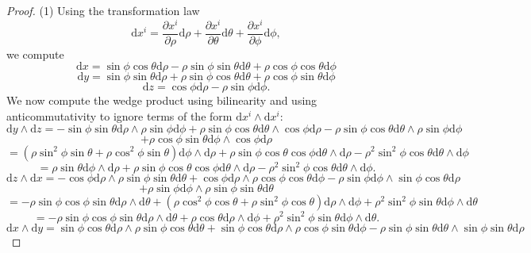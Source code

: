 \documentclass[10pt, letterpaper]{article}
\begin{document}
\begin{proof}
	(1) Using the transformation law
	\[
		\mathrm{d} x^i=\frac{\partial x^i}{\partial \rho } \mathrm{d} \rho +\frac{\partial x^i}{\partial \theta } \mathrm{d} \theta +\frac{\partial x^i}{\partial \phi } \mathrm{d} \phi ,
	\]
	we compute
	\[
		\mathrm{d} x=\sin \phi \cos \theta \mathrm{d} \rho - \rho \sin \phi \sin \theta \mathrm{d} \theta +\rho \cos \phi \cos \theta \mathrm{d} \phi 
	\]
	\[
		\mathrm{d} y=\sin \phi \sin \theta \mathrm{d} \rho +\rho \sin \phi \cos \theta \mathrm{d} \theta +\rho \cos \phi \sin \theta \mathrm{d} \phi 
	\]
	\[
		\mathrm{d} z=\cos \phi \mathrm{d} \rho -\rho \sin \phi \mathrm{d} \phi 
	.\]
	We now compute the wedge product using bilinearity and using anticommutativity to ignore terms of the form $\mathrm{d} x^i \wedge \mathrm{d} x^i$:
	\[
		\mathrm{d} y \wedge \mathrm{d} z=-\sin \phi \sin \theta \mathrm{d} \rho \wedge \rho \sin \phi \mathrm{d} \phi +\rho \sin \phi \cos \theta \mathrm{d} \theta \wedge \cos \phi \mathrm{d} \rho -\rho \sin \phi \cos \theta \mathrm{d} \theta \wedge \rho \sin \phi \mathrm{d} \phi 
	\]
	\[
		+\rho \cos \phi \sin \theta \mathrm{d} \phi \wedge \cos \phi \mathrm{d} \rho 
	\]
	\[
		=\left( \rho \sin^2\phi \sin \theta +\rho \cos^2 \phi \sin \theta  \right) \mathrm{d} \phi  \wedge \mathrm{d} \rho +\rho \sin \phi \cos \theta \cos \phi \mathrm{d} \theta \wedge \mathrm{d} \rho -\rho ^2 \sin ^2\phi \cos \theta \mathrm{d} \theta \wedge \mathrm{d} \phi 
	\]
	\[
		=\rho \sin \theta \mathrm{d} \phi \wedge \mathrm{d} \rho +\rho \sin \phi \cos \theta \cos \phi \mathrm{d} \theta \wedge \mathrm{d} \rho -\rho ^2 \sin ^2\phi \cos \theta \mathrm{d} \theta \wedge \mathrm{d} \phi 
	.\]
	\[
		\mathrm{d} z \wedge \mathrm{d} x=-\cos \phi \mathrm{d} \rho \wedge\rho \sin \phi \sin \theta \mathrm{d} \theta +\cos \phi \mathrm{d} \rho \wedge \rho \cos \phi \cos \theta \mathrm{d} \phi -\rho \sin \phi \mathrm{d} \phi \wedge \sin \phi \cos \theta \mathrm{d} \rho 
	\]
	\[
		+\rho \sin \phi \mathrm{d} \phi \wedge \rho \sin \phi \sin \theta \mathrm{d} \theta 
	\]
	\[
		=-\rho \sin \phi \cos \phi \sin \theta \mathrm{d} \rho \wedge \mathrm{d} \theta +\left( \rho \cos ^2 \phi \cos \theta +\rho \sin ^2\phi \cos \theta  \right) \mathrm{d} \rho \wedge \mathrm{d} \phi +\rho ^2 \sin ^2\phi \sin \theta \mathrm{d} \phi \wedge \mathrm{d} \theta 
	\]
	\[
		=-\rho \sin \phi \cos \phi \sin \theta \mathrm{d} \rho \wedge \mathrm{d} \theta +\rho \cos \theta \mathrm{d} \rho \wedge \mathrm{d} \phi +\rho ^2 \sin ^2 \phi \sin \theta \mathrm{d} \phi \wedge \mathrm{d} \theta 
	.\]
	\[
		\mathrm{d} x \wedge \mathrm{d} y=\sin \phi \cos \theta \mathrm{d} \rho \wedge \rho \sin \phi \cos \theta \mathrm{d} \theta +\sin \phi \cos \theta \mathrm{d} \rho \wedge \rho \cos \phi \sin \theta \mathrm{d} \phi -\rho \sin \phi \sin \theta \mathrm{d} \theta \wedge \sin \phi \sin \theta \mathrm{d} \rho
\]
\end{proof}
\end{document}
